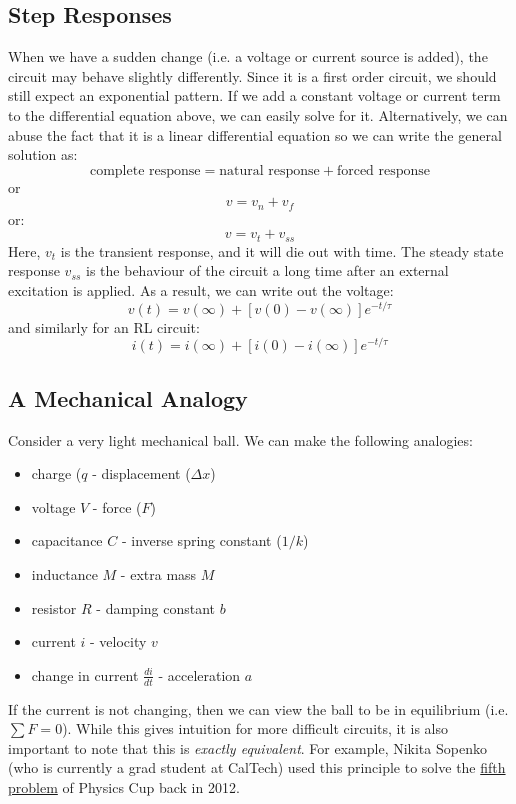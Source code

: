 \documentclass{article}
\begin{document}
\subsection{Step Responses}
When we have a sudden change (i.e. a voltage or current source is added), the circuit may behave slightly differently. Since it is a first order circuit, we should still expect an exponential pattern. If we add a constant voltage or current term to the differential equation above, we can easily solve for it. Alternatively, we can abuse the fact that it is a linear differential equation so we can write the general solution as:
\begin{equation}
    \text{complete response} = \text{natural response} + \text{forced response} 
\end{equation}
or
\begin{equation}
    v = v_n + v_f
\end{equation}
or:
\begin{equation}
    v = v_t + v_{ss}
\end{equation}
Here, $v_t$ is the transient response, and it will die out with time. The steady state response $v_{ss}$ is the behaviour of the circuit a long time after an external excitation is applied. As a result, we can write out the voltage:
\begin{equation}
    v(t) = v(\infty) + [v(0)-v(\infty)]e^{-t/\tau}
\end{equation}
and similarly for an RL circuit:
\begin{equation}
    i(t) = i(\infty) + [i(0) -i(\infty)]e^{-t/\tau}
\end{equation}
\subsection{A Mechanical Analogy}
Consider a very light mechanical ball. We can make the following analogies:
\begin{itemize}
    \item charge ($q$ - displacement ($\Delta x$)
    \item voltage $V$ - force ($F$)
    \item capacitance $C$ - inverse spring constant ($1/k$)
    \item inductance $M$ - extra mass $M$
    \item resistor $R$ - damping constant $b$
    \item current $i$ - velocity $v$
    \item change in current $\frac{di}{dt}$ - acceleration $a$
\end{itemize}
If the current is not changing, then we can view the ball to be in equilibrium (i.e. $\sum F = 0$). While this gives intuition for more difficult circuits, it is also important to note that this is \textit{exactly equivalent}. For example, Nikita Sopenko (who is currently a grad student at CalTech) used this principle to solve the \href{https://www.ipho2012.ee/physicscup/problem-no-5/solution/}{fifth problem} of Physics Cup back in 2012.
\end{document}
